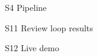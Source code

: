 \begin{frame}{S4 Pipeline}
\end{frame}

\begin{frame}{S11 Review loop results}
\end{frame}

\begin{frame}{S12 Live demo}
\end{frame}

